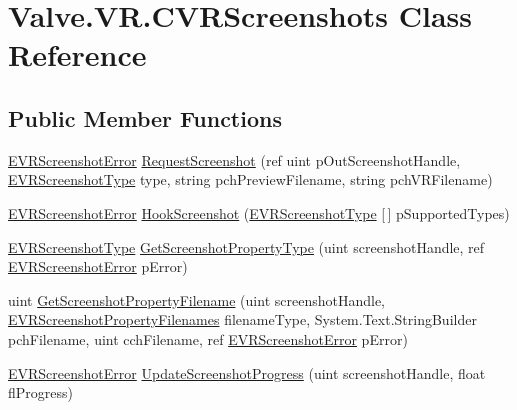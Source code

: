 \hypertarget{class_valve_1_1_v_r_1_1_c_v_r_screenshots}{}\section{Valve.\+V\+R.\+C\+V\+R\+Screenshots Class Reference}
\label{class_valve_1_1_v_r_1_1_c_v_r_screenshots}
\subsection*{Public Member Functions}
\begin{DoxyCompactItemize}
\item 
\mbox{\hyperlink{namespace_valve_1_1_v_r_ac73c6dcb1af8fe045a626296a21e226b}{E\+V\+R\+Screenshot\+Error}} \mbox{\hyperlink{class_valve_1_1_v_r_1_1_c_v_r_screenshots_a9094b49939eeb56fe471afdaa40e89b9}{Request\+Screenshot}} (ref uint p\+Out\+Screenshot\+Handle, \mbox{\hyperlink{namespace_valve_1_1_v_r_a033ac579445f0992130b11ba62c9b7ae}{E\+V\+R\+Screenshot\+Type}} type, string pch\+Preview\+Filename, string pch\+V\+R\+Filename)
\item 
\mbox{\hyperlink{namespace_valve_1_1_v_r_ac73c6dcb1af8fe045a626296a21e226b}{E\+V\+R\+Screenshot\+Error}} \mbox{\hyperlink{class_valve_1_1_v_r_1_1_c_v_r_screenshots_a83f44065529a466aa653c14c6a67cfc3}{Hook\+Screenshot}} (\mbox{\hyperlink{namespace_valve_1_1_v_r_a033ac579445f0992130b11ba62c9b7ae}{E\+V\+R\+Screenshot\+Type}} \mbox{[}$\,$\mbox{]} p\+Supported\+Types)
\item 
\mbox{\hyperlink{namespace_valve_1_1_v_r_a033ac579445f0992130b11ba62c9b7ae}{E\+V\+R\+Screenshot\+Type}} \mbox{\hyperlink{class_valve_1_1_v_r_1_1_c_v_r_screenshots_a6442fc8cc137ca7a4b8ed40b4bfdb268}{Get\+Screenshot\+Property\+Type}} (uint screenshot\+Handle, ref \mbox{\hyperlink{namespace_valve_1_1_v_r_ac73c6dcb1af8fe045a626296a21e226b}{E\+V\+R\+Screenshot\+Error}} p\+Error)
\item 
uint \mbox{\hyperlink{class_valve_1_1_v_r_1_1_c_v_r_screenshots_a16edbbb8fd1c87e355df924682eb407b}{Get\+Screenshot\+Property\+Filename}} (uint screenshot\+Handle, \mbox{\hyperlink{namespace_valve_1_1_v_r_a5a78926aed6b08da8e0e0b8f79911e34}{E\+V\+R\+Screenshot\+Property\+Filenames}} filename\+Type, System.\+Text.\+String\+Builder pch\+Filename, uint cch\+Filename, ref \mbox{\hyperlink{namespace_valve_1_1_v_r_ac73c6dcb1af8fe045a626296a21e226b}{E\+V\+R\+Screenshot\+Error}} p\+Error)
\item 
\mbox{\hyperlink{namespace_valve_1_1_v_r_ac73c6dcb1af8fe045a626296a21e226b}{E\+V\+R\+Screenshot\+Error}} \mbox{\hyperlink{class_valve_1_1_v_r_1_1_c_v_r_screenshots_a68d2c2b6d193819be408757bfe8cf638}{Update\+Screenshot\+Progress}} (uint screenshot\+Handle, float fl\+Progress)

\end{DoxyCompactItemize}
